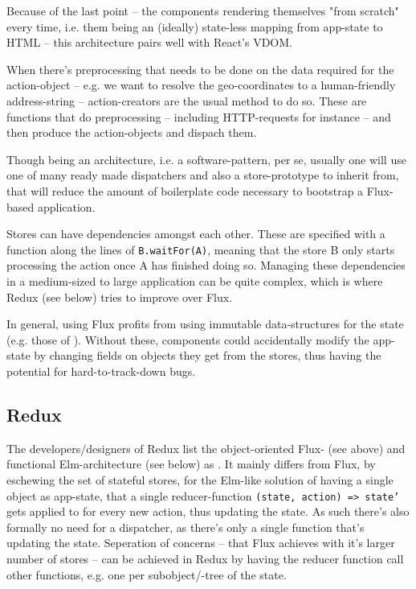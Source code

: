 Because of the last point -- the components rendering themselves "from scratch" every time, i.e. them being an (ideally) state-less mapping from app-state to HTML -- this architecture pairs well with React's VDOM.

When there's preprocessing that needs to be done on the data required for the action-object -- e.g. we want to resolve the geo-coordinates to a human-friendly address-string -- action-creators are the usual method to do so. These are functions that do preprocessing -- including HTTP-requests for instance -- and then produce the action-objects and dispach them. 

Though being an architecture, i.e. a software-pattern,  per se, usually one will use one of many ready made dispatchers and also a store-prototype to inherit from, that will reduce the amount of boilerplate code necessary to bootstrap a Flux-based application.

Stores can have dependencies amongst each other. These are specified with a function along the lines of \texttt{B.waitFor(A)}, meaning that the store B only starts processing the action once A has finished doing so. Managing these dependencies in a medium-sized to large application can be quite complex, which is where Redux (see below) tries to improve over Flux.

In general, using Flux profits from using immutable data-structures for the state (e.g. those of ). Without these, components could accidentally modify the app-state by changing fields on objects they get from the stores, thus having the potential for hard-to-track-down bugs.
 

\subsection{Redux}\label{ref:redux}

The developers/designers of Redux list the object-oriented Flux- (see above) and functional Elm-architecture (see below) as . It mainly differs from Flux, by eschewing the set of stateful stores, for the Elm-like solution of having a single object as app-state, that a single reducer-function \texttt{(state, action) => state'} gets applied to for every new action, thus updating the state. As such there's also formally no need for a
dispatcher, as there's only a single function that's updating the state. Seperation of concerns -- that Flux achieves with it's larger number of stores -- can be achieved in Redux by having the reducer function call other functions, e.g. one per subobject/-tree of the state. 

